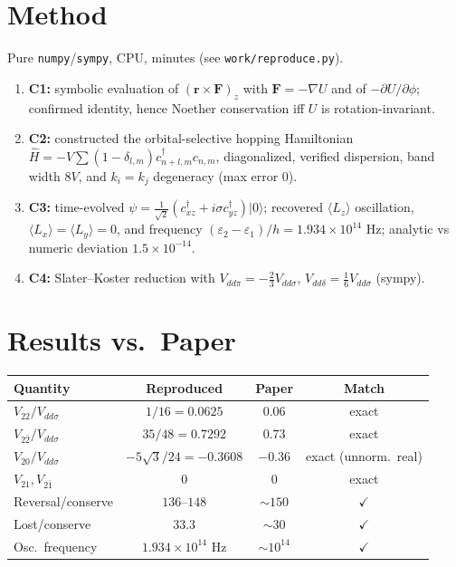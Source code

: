 \documentclass[11pt]{article}
\begin{document}
\section{Method}
Pure \texttt{numpy}/\texttt{sympy}, CPU, minutes (see \texttt{work/reproduce.py}).
\begin{enumerate}
\item \textbf{C1:} symbolic evaluation of $(\mathbf{r}\times\mathbf{F})_z$ with $\mathbf{F}=-\nabla U$
and of $-\partial U/\partial\phi$; confirmed identity, hence Noether conservation iff $U$ is
rotation-invariant.
\item \textbf{C2:} constructed the orbital-selective hopping Hamiltonian
$\hat H=-V\sum(1-\delta_{l,m})c^\dagger_{n+l,m}c_{n,m}$, diagonalized, verified dispersion,
band width $8V$, and $k_i=k_j$ degeneracy (max error $0$).
\item \textbf{C3:} time-evolved $\psi=\tfrac1{\sqrt2}(c^\dagger_{xz}+i\sigma c^\dagger_{yz})|0\rangle$;
recovered $\langle L_z\rangle$ oscillation, $\langle L_x\rangle=\langle L_y\rangle=0$, and
frequency $(\varepsilon_2-\varepsilon_1)/h=1.934\times10^{14}$ Hz; analytic vs numeric deviation
$1.5\times10^{-14}$.
\item \textbf{C4:} Slater--Koster reduction with $V_{dd\pi}=-\tfrac23V_{dd\sigma}$,
$V_{dd\delta}=\tfrac16V_{dd\sigma}$ (sympy).
\end{enumerate}

\section{Results vs.\ Paper}
\begin{table}[h]\centering\small
\begin{tabular}{lccc}
\toprule
Quantity & Reproduced & Paper & Match \\
\midrule
$V_{22}/V_{dd\sigma}$ & $1/16=0.0625$ & $0.06$ & exact \\
$V_{2\bar2}/V_{dd\sigma}$ & $35/48=0.7292$ & $0.73$ & exact \\
$V_{20}/V_{dd\sigma}$ & $-5\sqrt3/24=-0.3608$ & $-0.36$ & exact (unnorm.\ real) \\
$V_{21},V_{2\bar1}$ & $0$ & $0$ & exact \\
Reversal/conserve & $136$--$148$ & $\sim150$ & $\checkmark$ \\
Lost/conserve & $33.3$ & $\sim30$ & $\checkmark$ \\
Osc.\ frequency & $1.934\times10^{14}$ Hz & $\sim10^{14}$ & $\checkmark$ \\
\bottomrule
\end{tabular}
\end{table}
\end{document}
